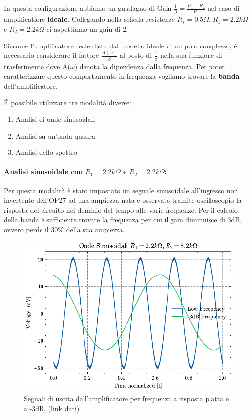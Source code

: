 In questa configurazione abbiamo un guadagno di Gain $\frac{1}{\beta} = \frac{R_1+R_2}{R_1}$ nel caso di amplificatiore \textbf{ideale}.
Collegando nella scheda resistenze $R_s = 0.5 \Omega$, $R_1 = 2.2k\Omega$ e $R_2 = 2.2k\Omega$ ci aspettiamo un gain di 2.

Siccome l'amplificatore reale dista dal modello ideale di un polo complesso, è necessario considerare il fattore $\frac{A(\omega)}{\beta}$ al posto di $\frac{1}{\beta}$ nella sua funzione di trasferimento dove A($\omega$) denota la dipendenza dalla frequenza. Per poter caratterizzare questo comportamento in frequenza vogliamo trovare la \textbf{banda} dell'amplificatore.

\'E possibile utilizzare tre modalità diverse:
\begin{enumerate}
    \item Analisi di onde sinusoidali
    \item Analisi su un'onda quadra
    \item Analisi dello spettro
\end{enumerate}

\paragraph{Analisi sinusoidale con $R_1=2.2k\Omega$ e $R_2=2.2k\Omega$:}

Per questa modalità è stato impostato un segnale sinusoidale all'ingresso non invertente dell'OP27 ad una ampiezza nota e osservato tramite oscilloscopio la risposta del circuito nel dominio del tempo alle varie frequenze. Per il calcolo della banda è sufficiente trovare la frequenza per cui il gain diminuisce di 3dB, ovvero perde il 30\% della sua ampiezza.

\begin{figure}[!h]
    \centering
    \includegraphics[width=0.5\linewidth]{analog/assets/OP27/Non Invertente/Sin_2k2.pdf}
    \caption{Segnali di uscita dall'amplificatore per frequenza a risposta piatta e a -3dB, (\href{https://github.com/Yedi278/Esperimentazioni-Elettronica/tree/main/-\%20OPAMP/OP27/Non-Invertente/R1\%3D2.2k\%2CR2\%3D2.2k}{link dati})}
\end{figure}

